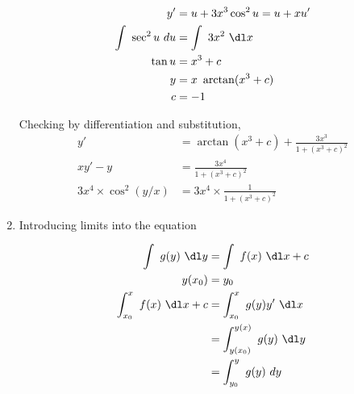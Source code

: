 \begin{enumerate}
          \begin{align}
              y'                  & = u + 3x^{3} \cos ^{2} u = u + xu' \\
              \int\ \sec^{2}u\ du & = \int\ 3x^{2}\ \dl x              \\
              \tan u              & = x^{3} + c                        \\
              y                   & = x\ \arctan (x^{3} + c)           \\
              c                   & = -1
          \end{align}
          \begin{figure}[H]
              \centering
          \end{figure}
          Checking by differentiation and substitution,
          \begin{align}
              y'                           & = \arctan (x^{3} + c) + \frac{3x^{3}}{1 + (x^{3} + c)^{2}} \\
              xy' - y                      & = \frac{3x^{4}}{1 + (x^{3} + c)^{2}}                       \\
              3x^{4} \times \cos ^{2}(y/x) & = 3x^{4} \times \frac{1}{1 + (x^{3} +c)^{2}}
          \end{align}


    \item Introducing limits into the equation

          \begin{align}
              \int\ g(y)\ \dl y                  & = \int\ f(x)\ \dl x + c                \\
              y(x_{0})                           & = y_{0}                                \\
              \int_{x_{0}}^{x}\ f(x) \ \dl x + c & = \int_{x_{0}}^{x} \ g(y) y'\ \dl x    \\
                                                 & = \int_{y(x_{0})}^{y(x)} \ g(y)\ \dl y \\
                                                 & = \int_{y_{0}}^{y} \ g(y)\ dy
          \end{align}



\end{enumerate}
